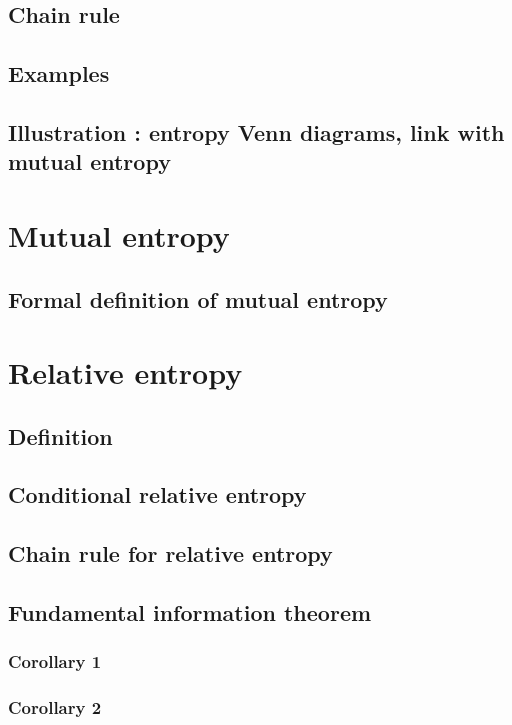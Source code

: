 \documentclass[a4paper, 12pt]{book}
\begin{document}
\subsection{Chain rule}
\subsection{Examples}
\subsection{Illustration : entropy Venn diagrams, link with mutual entropy}

\section{Mutual entropy}
\subsection{Formal definition of mutual entropy}

\section{Relative entropy}
\subsection{Definition}
\subsection{Conditional relative entropy}
\subsection{Chain rule for relative entropy}
\subsection{Fundamental information theorem}
\subsubsection{Corollary 1}
\subsubsection{Corollary 2}
\end{document}
